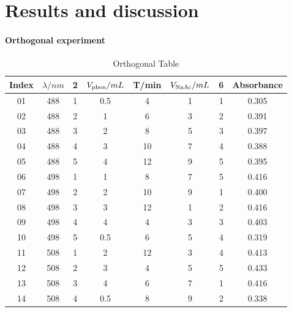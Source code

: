 \section{Results and discussion}

\paragraph{Orthogonal experiment}
\begin{table}[H]
    \caption{Orthogonal Table}
    \label{Tab.Ort}
    \begin{tabular}{cccccccc}
    \toprule
    Index & $\lambda /nm$ & 2 & $V_{\ce{phen}}/mL$ & T/min & $V_{\ce{NaAc}}/mL$ & 6 & Absorbance\\
    \midrule
    01    & 488           & 1 & 0.5                & 4     & 1                  & 1 & 0.305     \\
    02    & 488           & 2 & 1                  & 6     & 3                  & 2 & 0.391     \\
    03    & 488           & 3 & 2                  & 8     & 5                  & 3 & 0.397     \\
    04    & 488           & 4 & 3                  & 10    & 7                  & 4 & 0.388     \\
    05    & 488           & 5 & 4                  & 12    & 9                  & 5 & 0.395     \\
    06    & 498           & 1 & 1                  & 8     & 7                  & 5 & 0.416     \\
    07    & 498           & 2 & 2                  & 10    & 9                  & 1 & 0.400     \\
    08    & 498           & 3 & 3                  & 12    & 1                  & 2 & 0.416     \\
    09    & 498           & 4 & 4                  & 4     & 3                  & 3 & 0.403     \\
    10    & 498           & 5 & 0.5                & 6     & 5                  & 4 & 0.319     \\
    11    & 508           & 1 & 2                  & 12    & 3                  & 4 & 0.413     \\
    12    & 508           & 2 & 3                  & 4     & 5                  & 5 & 0.433     \\
    13    & 508           & 3 & 4                  & 6     & 7                  & 1 & 0.416     \\
    14    & 508           & 4 & 0.5                & 8     & 9                  & 2 & 0.338     \\

\end{tabular}
\end{table}
